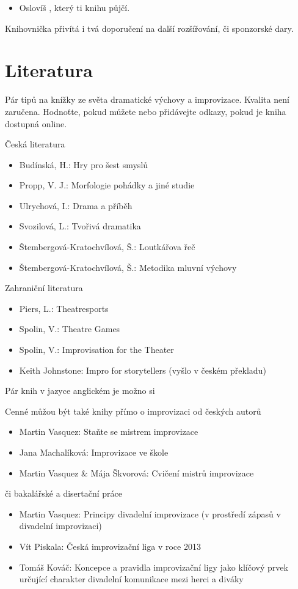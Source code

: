 \begin{itemize}
\item  Oslovíš , který ti knihu půjčí.
\end{itemize}
 
Knihovnička přivítá i tvá doporučení na další rozšířování, či sponzorské dary. 
\needspace{5cm} \section{Literatura} \label{literatura} Pár tipů na knížky ze světa dramatické výchovy a improvizace. Kvalita není zaručena. Hodnoťte, pokud můžete nebo přidávejte odkazy, pokud je kniha dostupná online. 
 
Česká literatura 
\begin{itemize}
\item  Budínská, H.: Hry pro šest smyslů
\item  Propp, V. J.: Morfologie pohádky a jiné studie
\item  Ulrychová, I.: Drama a příběh
\item  Svozilová, L.: Tvořivá dramatika
\item  Štembergová-Kratochvílová, Š.: Loutkářova řeč
\item  Štembergová-Kratochvílová, Š.: Metodika mluvní výchovy
\end{itemize}
 
 
Zahraniční literatura  
 
\begin{itemize}
\item  Piers, L.: Theatresports
\item  Spolin, V.: Theatre Games
\item  Spolin, V.: Improvisation for the Theater
\item  Keith Johnstone: Impro for storytellers  (vyšlo v českém překladu)
\end{itemize}
 
Pár knih v jazyce anglickém je možno si  
 
Cenné můžou být také knihy přímo o improvizaci od českých autorů 
\begin{itemize}
\item  Martin Vasquez: Staňte se mistrem improvizace
\item  Jana Machalíková: Improvizace ve škole
\item  Martin Vasquez & Mája Škvorová: Cvičení mistrů improvizace
\end{itemize}
 
či bakalářské a disertační práce 
\begin{itemize}
\item  Martin Vasquez: Principy  divadelní  improvizace  (v  prostředí  zápasů  v  divadelní improvizaci)
\item  Vít Piskala: Česká improvizační liga v roce 2013
\item  Tomáš Kováč: Koncepce a pravidla improvizační ligy jako klíčový prvek určující charakter divadelní komunikace mezi herci a diváky
\end{itemize}
 
 
 

